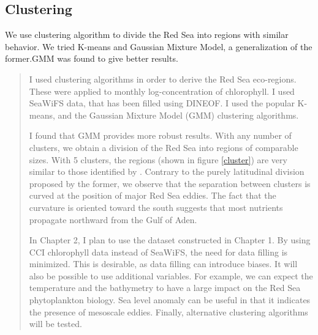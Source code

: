 \subsection{Clustering}

We use clustering algorithm to divide the Red Sea into regions with similar
behavior. We tried K-means and Gaussian Mixture Model, a generalization of the
former.GMM was found to give better results.

\begin{quotation} I used clustering algorithms in order to derive the Red Sea
eco-regions. These were applied to monthly log-concentration of chlorophyll. I
used SeaWiFS data, that has been filled using DINEOF. I used the popular
K-means, and the Gaussian Mixture Model (GMM) clustering algorithms.

I found that GMM provides more robust results. With any number of clusters, we
obtain a division of the Red Sea into regions of comparable sizes.  With 5
clusters, the regions (shown in figure \ref{cluster}) are very similar to those
identified by \citet{Raitsos2013}.  Contrary to the purely latitudinal division
proposed by the former, we observe that the separation between clusters is
curved at the position of major Red Sea eddies.  The fact that the curvature is
oriented toward the south suggests that most nutrients propagate northward from
the Gulf of Aden.


In Chapter 2, I plan to use the dataset constructed in Chapter 1.  By using CCI
chlorophyll data instead of SeaWiFS, the need for data filling is minimized.
This is desirable, as data filling can introduce biases. It will also be
possible to use additional variables. For example, we can expect the
temperature and the bathymetry to have a large impact on the Red Sea
phytoplankton biology. Sea level anomaly can be useful in that it indicates the
presence of mesoscale eddies. Finally, alternative clustering algorithms will
be tested.  \end{quotation}

